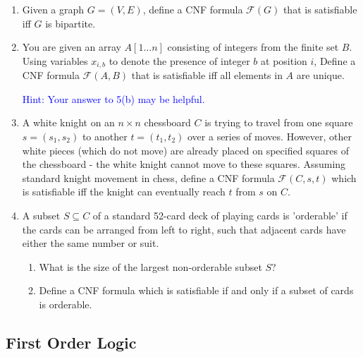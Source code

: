 \documentclass[a4paper, 12pt]{article}
\begin{document}
\begin{enumerate}
\item
Given a graph $G = (V, E)$, define a CNF formula $\mathcal{F}(G)$ that is satisfiable iff $G$ is bipartite.

\item 
You are given an array $A[1\dots n]$ consisting of integers from the finite set $B$.
Using variables $x_{i,b}$ to denote the presence of integer $b$ at position $i$, Define a CNF formula $\mathcal{F}(A, B)$ that is satisfiable iff all elements in $A$ are unique.

{ \small \textcolor{blue}{Hint: Your answer to 5(b) may be helpful.} }

\item
A white knight on an $n \times n$ chessboard $C$ is trying to travel from one square $s = (s_1, s_2)$ to another $t = (t_1, t_2)$ over a series of moves.
However, other white pieces (which do not move) are already placed on specified squares of the chessboard - the white knight cannot move to these squares.
Assuming standard knight movement in chess, define a CNF formula $\mathcal{F}(C, s, t)$ which is satisfiable iff the knight can eventually reach $t$ from $s$ on $C$.

\item A subset $S \subseteq C$ of a standard 52-card deck of playing cards is 'orderable' if the cards can be arranged from left to right,
 such that adjacent cards have either the same number or suit.
\begin{enumerate}
    \item What is the size of the largest non-orderable subset $S$?
    \item Define a CNF formula which is satisfiable if and only if a subset of cards is orderable.
\end{enumerate}

\end{enumerate}

\newpage

\subsection*{First Order Logic}
\end{document}
